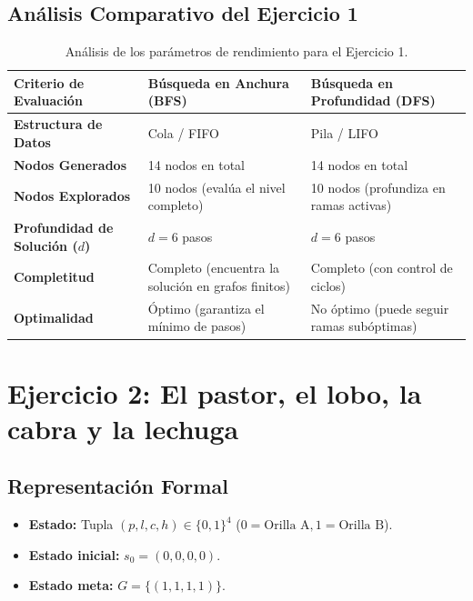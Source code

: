 \documentclass[11pt,letterpaper]{article}
\begin{document}
\subsection{Análisis Comparativo del Ejercicio 1}

\begin{table}[H]
\centering\small
\renewcommand{\arraystretch}{1.2}
\begin{tabularx}{\linewidth}{@{} l X X @{}}
\toprule
\textbf{Criterio de Evaluación} & \textbf{Búsqueda en Anchura (BFS)} & \textbf{Búsqueda en Profundidad (DFS)} \\
\midrule
\textbf{Estructura de Datos} & Cola / FIFO & Pila / LIFO \\
\textbf{Nodos Generados} & 14 nodos en total & 14 nodos en total \\
\textbf{Nodos Explorados} & 10 nodos (evalúa el nivel completo) & 10 nodos (profundiza en ramas activas) \\
\textbf{Profundidad de Solución ($d$)} & $d = 6$ pasos & $d = 6$ pasos \\
\textbf{Completitud} & Completo (encuentra la solución en grafos finitos) & Completo (con control de ciclos) \\
\textbf{Optimalidad} & Óptimo (garantiza el mínimo de pasos) & No óptimo (puede seguir ramas subóptimas) \\
\bottomrule
\end{tabularx}
\caption{Análisis de los parámetros de rendimiento para el Ejercicio 1.}
\end{table}

\section{Ejercicio 2: El pastor, el lobo, la cabra y la lechuga}

\subsection{Representación Formal}
\begin{itemize}
  \item \textbf{Estado:} Tupla $(p, l, c, h) \in \{0,1\}^4$ ($0=\text{Orilla A}, 1=\text{Orilla B}$).
  \item \textbf{Estado inicial:} $s_0 = (0,0,0,0)$.
  \item \textbf{Estado meta:} $G = \{(1,1,1,1)\}$.
\end{itemize}
\end{document}
